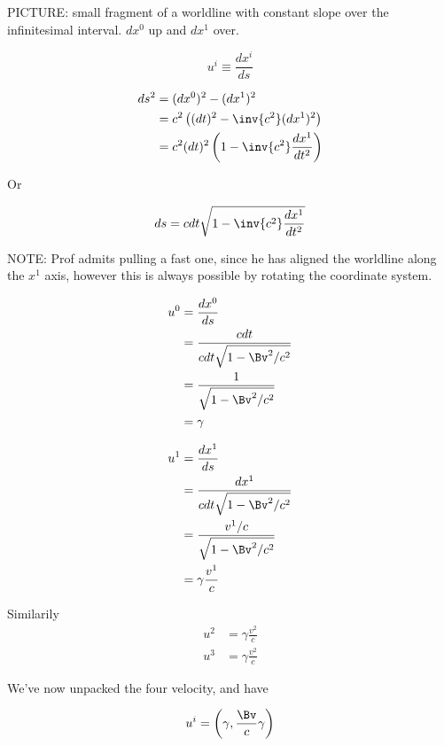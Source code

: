 PICTURE: small fragment of a worldline with constant slope over the infinitesimal interval.  $dx^0$ up and $dx^1$ over.

\begin{equation}\label{eqn:relativisticElectrodynamicsL7:70}
u^i \equiv \frac{dx^i}{ds}
\end{equation}

\begin{align*}
ds^2 
&= (dx^0)^2 - (dx^1)^2 \\
&= c^2 \left( (dt)^2 - \inv{c^2} (dx^1)^2 \right) \\
&= c^2 (dt)^2 \left( 1 - \inv{c^2} \frac{dx^1}{dt^2} \right) 
\end{align*}

Or 

\begin{align}\label{eqn:relativisticElectrodynamicsL7:90}
ds = c dt \sqrt{1 - \inv{c^2} \frac{dx^1}{dt^2} }
\end{align}

NOTE: Prof admits pulling a fast one, since he has aligned the worldline along the $x^1$ axis, however this is always possible by rotating the coordinate system.

\begin{align*}
u^0 
&= \frac{dx^0}{ds} \\
&= \frac{c dt}{ c dt \sqrt{ 1 - \Bv^2/c^2} } \\
&= \frac{1}{ \sqrt{ 1 - \Bv^2/c^2} } \\
&= \gamma
\end{align*}

\begin{align*}
u^1 
&= \frac{dx^1}{ds} \\
&= \frac{dx^1 }{ c dt \sqrt{ 1 - \Bv^2/c^2} } \\
&= \frac{v^1/c}{ \sqrt{ 1 - \Bv^2/c^2} } \\
&= \gamma \frac{v^1}{c}
\end{align*}

Similarily
\begin{align*}
u^2 &= \gamma \frac{v^2}{c} \\
u^3 &= \gamma \frac{v^2}{c}
\end{align*}

We've now unpacked the four velocity, and have

\begin{equation}\label{eqn:relativisticElectrodynamicsL7:100}
u^i = \left( \gamma, \frac{\Bv}{c} \gamma \right)
\end{equation}

